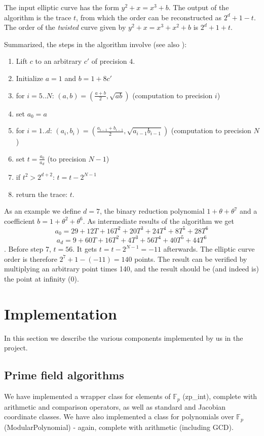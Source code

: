 \documentclass[11pt,english]{article}
\begin{document}
The input elliptic curve has the form $y^2+x=x^3+b$. The output of the algorithm is the trace $t$, from which the order can be reconstructed as $2^d+1-t$. The order of the \emph{twisted} curve given by $y^2+x=x^3+x^2+b$ is $2^d+1+t$.

Summarized, the steps in the algorithm involve (see also \cite{handbook}):
\begin{enumerate}
 \item Lift $c$ to an arbitrary $c'$ of precision $4$.
 \item Initialize $a=1$ and $b=1+8c'$
 \item for $i=5..N$: $(a,b)=(\frac{a+b}{2},\sqrt{ab})$ (computation to precision $i$)
 \item set $a_0=a$
 \item for $i=1..d$: $(a_i,b_i)=(\frac{a_{i-1}+b_{i-1}}{2},\sqrt{a_{i-1}b_{i-1}})$ (computation to precision $N$)
 \item set $t=\frac{a_0}{a_d}$ (to precision $N-1$)
 \item if $t^2>2^{d+2}$: $t=t-2^{N-1}$
 \item return the trace: $t$.
\end{enumerate}

As an example we define $d=7$, the binary reduction polynomial $1+\theta+\theta^7$ and a coefficient $b=1+\theta^2+\theta^6$. As intermediate results of the algorithm we get 
\begin{displaymath}a_0=29+12T+16T^2+20T^3+24T^4+8T^5+28T^6\end{displaymath}
\begin{displaymath}a_d=9+60T+16T^2+4T^3+56T^4+40T^5+44T^6\end{displaymath}.
Before step 7, $t=56$. It gets $t=t-2^{N-1}=-11$ afterwards. The elliptic curve order is therefore $2^7+1-(-11)=140$ points. The result can be verified by multiplying an arbitrary point times 140, and the result should be (and indeed is) the point at infinity ($0$).

\section{Implementation}
In this section we describe the various components implemented by us in the project.
\subsection{Prime field algorithms}
We have implemented a wrapper class for elements of $\mathbb{F}_p$ (zp\_int), complete with arithmetic and comparison operators, as
well as standard and Jacobian coordinate classes. We have also implemented a class for polynomials over $\mathbb{F}_p$ (ModularPolynomial) - again, complete with arithmetic (including GCD).
\end{document}
